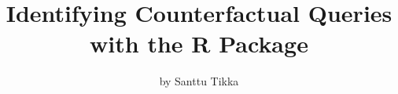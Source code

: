 \title{Identifying Counterfactual Queries with the R Package }
\author{by Santtu Tikka}


\maketitle

